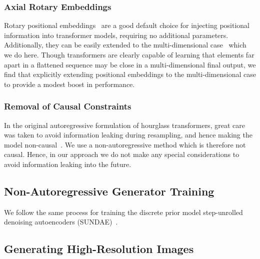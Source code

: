 \subsubsection{Axial Rotary Embeddings}

Rotary positional embeddings~\cite{su2021roformer} are a good default choice for
injecting positional information into transformer models, requiring no
additional parameters. Additionally, they can be easily extended to the
multi-dimensional case~\cite{rope-eleutherai} which we do here. Though
transformers are clearly capable of learning that elements far apart in a
flattened sequence may be close in a multi-dimensional final output, we find
that explicitly extending positional embeddings to the multi-dimensional case to
provide a modest boost in performance.

\subsubsection{Removal of Causal Constraints}

In the original autoregressive formulation of hourglass transformers, great care
was taken to avoid information leaking during resampling, and hence making the
model non-causal~\cite{nawrot2021hierarchical}. We use a non-autoregressive
method which is therefore not causal. Hence, in our approach we do not make any
special considerations to avoid information leaking into the future.

\subsection{Non-Autoregressive Generator Training}
We follow the same process for training the discrete prior model step-unrolled
denoising autoencoders (SUNDAE)~\cite{savinov2022stepunrolled}.


\subsection{Generating High-Resolution Images}


